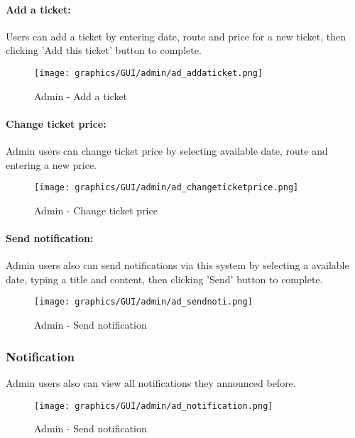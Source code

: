             \paragraph{Add a ticket:}
                \noindent Users can add a ticket by entering date, route and price for a new ticket, then clicking 'Add this ticket' button to complete.
                        \begin{figure}[H]
                        \centering
                        \texttt{[image: graphics/GUI/admin/ad\_addaticket.png]}
                        \caption{Admin - Add a ticket}
                        \label{fig:ad_addaticket}
                        \end{figure}
                        
            \paragraph{Change ticket price:}        
                \noindent Admin users can change ticket price by selecting available date, route and entering a new price.
                        \begin{figure}[H]
                        \centering
                        \texttt{[image: graphics/GUI/admin/ad\_changeticketprice.png]}
                        \caption{Admin - Change ticket price}
                        \label{fig:ad_changeticketprice}
                        \end{figure}
                        
            \paragraph{Send notification:}
                 \noindent Admin users also can send notifications via this system by selecting a available date, typing a title and content, then clicking 'Send' button to complete.
                        \begin{figure}[H]
                        \centering
                        \texttt{[image: graphics/GUI/admin/ad\_sendnoti.png]}
                        \caption{Admin - Send notification}
                        \label{fig:ad_sendnoti}
                        \end{figure}

        \subsubsection{Notification} 
            \noindent Admin users also can view all notifications they announced before.
                \begin{figure}[H]
                        \centering
                        \texttt{[image: graphics/GUI/admin/ad\_notification.png]}
                        \caption{Admin - Send notification}
                        \label{fig:ad_sendnoti}
                        \end{figure}
                        
